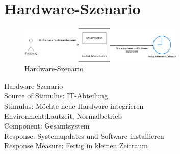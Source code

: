 \section{Hardware-Szenario}
\begin{figure}[tbh]
  \centering
  \includegraphics[width=0.7\textwidth]{Graphics/Hardware.png}
  \caption{Hardware-Szenario}
  \label{fig:Qualitaet6}
\end{figure}


Hardware-Szenario\\
Source of Stimulus: IT-Abteilung\\
Stimulus: Möchte neue Hardware integrieren\\
Environment:Lautzeit, Normalbetrieb\\
Component: Gesamtsystem\\
Response: Systemupdates und Software installieren\\
Response Measure: Fertig in kleinen Zeitraum\\

